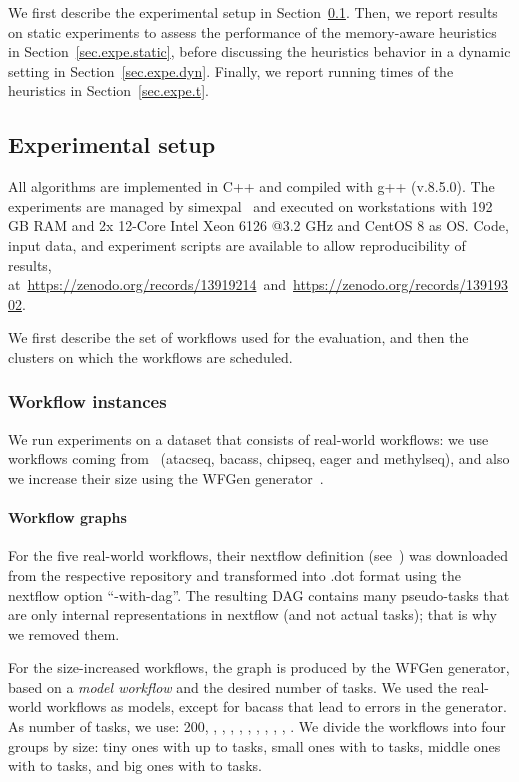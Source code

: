 \documentclass[conference]{IEEEtran}
\newcommand{\skug}[1]{{\color{blue}[SK: #1]}}
\begin{document}
We first describe the experimental setup in Section~\ref{sec:setup}. 
Then, we report results on static experiments to assess the performance
of the memory-aware heuristics in Section~\ref{sec.expe.static}, before
discussing the heuristics behavior in a dynamic setting in Section~\ref{sec.expe.dyn}. 
Finally, we report running times of the heuristics in Section~\ref{sec.expe.t}. 

\subsection{Experimental setup} %
    \label{sec:setup}

    All algorithms are implemented in C++ and compiled with g++ (v.8.5.0).
    The experiments are managed by simexpal~\cite{DBLP:journals/algorithms/AngrimanGLMNPT19} and executed on workstations with 192 GB RAM and 2x 12-Core Intel Xeon 6126 @3.2 GHz
    and CentOS 8 as OS.
    Code, input data, and experiment scripts are available to allow reproducibility of results, at~\url{https://zenodo.org/records/13919214}~and~\url{https://zenodo.org/records/13919302}.

    We first describe the set of workflows used for the evaluation, and then the clusters on which the
    workflows are scheduled.

    \subsubsection{Workflow instances}
    We run  experiments on a dataset that consists of real-world workflows: 
    we use workflows coming from~\cite{lotaru} (atacseq, bacass, chipseq,
    eager and methylseq), and also we increase their size using the WFGen generator~\cite{COLEMAN202216}.


    \paragraph{Workflow graphs}
    For the five real-world workflows, their nextflow definition (see~\cite{ewels2020nf}) was downloaded from the
    respective repository and transformed into .dot format using the nextflow option ``-with-dag''.
    The resulting DAG contains many pseudo-tasks that are only internal representations in nextflow
    (and not actual tasks); that is why we removed them.

    For the size-increased workflows, the graph is produced by the WFGen generator, based on a {\em model workflow} and
    the desired number of tasks.
    We used the real-world workflows as models, except for bacass that lead to errors in the generator.
%
    As number of tasks, we use: 200, , , , , ,
    , , , , .
    We divide the workflows into four groups by size: tiny ones with up to  tasks, small ones with  to  tasks,
    middle ones with  to  tasks, and big ones with  to  tasks.
\end{document}
